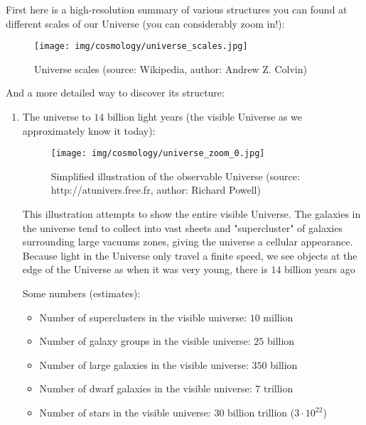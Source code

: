 	First here is a high-resolution summary of various structures you can found at different scales of our Universe (you can considerably zoom in!):
	\begin{figure}[H]
		\centering
		\texttt{[image: img/cosmology/universe\_scales.jpg]}
		\caption[Universe scales]{Universe scales (source: Wikipedia, author: Andrew Z. Colvin)}
	\end{figure}
	And a more detailed way to discover its structure:
	\begin{enumerate}
		\item The universe to $14$ billion light years (the visible Universe as we approximately know it today):
		\begin{figure}[H]
			\centering
			\texttt{[image: img/cosmology/universe\_zoom\_0.jpg]}
			\caption[Simplified illustration of the observable Universe]{Simplified illustration of the observable Universe (source: http://atunivers.free.fr, author: Richard Powell)}
		\end{figure}
		This illustration attempts to show the entire visible Universe. The galaxies in the universe tend to collect into vast sheets and "supercluster" of galaxies surrounding large vacuums zones, giving the universe a cellular appearance. Because light in the Universe only travel a finite speed, we see objects at the edge of the Universe as when it was very young, there is $14$ billion years ago

		Some numbers (estimates):
		\begin{itemize}
			\item Number of superclusters in the visible universe: $10$ million
			\item Number of galaxy groups in the visible universe: $25$ billion
			\item Number of large galaxies in the visible universe: $350$ billion
			\item Number of dwarf galaxies in the visible universe: $7$ trillion
			\item Number of stars in the visible universe: $30$ billion trillion  ($3\cdot 10^{22}$)
		\end{itemize}
		

\end{enumerate}
